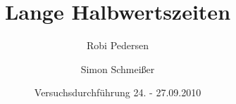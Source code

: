 \documentclass[a4paper,oneside]{scrartcl} %
\title{Lange Halbwertszeiten}
\author{Robi Pedersen \and Simon Schmeißer}
\date{Versuchsdurchführung 24. - 27.09.2010}
\begin{document}
\begin{titlepage}
  \maketitle
  \vfill
  \thispagestyle{empty}
\end{titlepage}

\tableofcontents
\clearpage


\clearpage







% 
%
\end{document}
